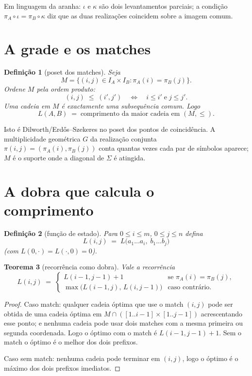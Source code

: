 \documentclass[11pt,a4paper]{article}
\newtheorem{teorema}{Teorema}
\newtheorem{definicao}[teorema]{Definição}
\begin{document}
\noindent Em linguagem da aranha: $\iota$ e $\kappa$ são dois
levantamentos parciais; a condição $\pi_A\circ\iota=\pi_B\circ\kappa$
diz que as duas realizações coincidem sobre a imagem comum.

\section{A grade e os matches}

\begin{definicao}[poset dos matches]
Seja
\[
M=\bigl\{(i,j)\in I_A\times I_B:\pi_A(i)=\pi_B(j)\bigr\}.
\]
Ordene $M$ pela ordem produto:
\[
(i,j)\;\le\;(i',j')\quad\iff\quad i\le i'\;\text{e}\;j\le j'.
\]
Uma cadeia em $M$ é exactamente uma subsequência comum.
Logo
\[
\boxed{\;L(A,B)\;=\;\text{comprimento da maior cadeia em }(M,\le).\;}
\]
\end{definicao}

\noindent Isto é Dilworth/Erdős–Szekeres no poset dos pontos de
coincidência. A multiplicidade geométrica $G$ da realização
conjunta $\pi(i,j)=(\pi_A(i),\pi_B(j))$ conta quantas vezes cada
par de símbolos aparece; $M$ é o suporte onde a diagonal de $\Sigma$
é atingida.

\section{A dobra que calcula o comprimento}

\begin{definicao}[função de estado]
Para $0\le i\le m$, $0\le j\le n$ defina
\[
L(i,j)\;=\;L\bigl(a_1\dots a_i,\;b_1\dots b_j\bigr)
\]
(com $L(0,\cdot)=L(\cdot,0)=0$).
\end{definicao}

\begin{teorema}[recorrência como dobra]\label{thm:lcs-dobra}
Vale a recorrência
\[
L(i,j)\;=\;
\begin{cases}
L(i-1,j-1)+1 & \text{se }\pi_A(i)=\pi_B(j),\\[4pt]
\max\bigl(L(i-1,j),\,L(i,j-1)\bigr) & \text{caso contrário.}
\end{cases}
\]
\end{teorema}

\begin{proof}
Caso match: qualquer cadeia óptima que use o match $(i,j)$ pode ser
obtida de uma cadeia óptima em $M\cap([1..i-1]\times[1..j-1])$
acrescentando esse ponto; e nenhuma cadeia pode usar dois matches
com a mesma primeira ou segunda coordenada. Logo o óptimo com o
match é $L(i-1,j-1)+1$. Sem o match o óptimo é o melhor dos dois
prefixos.

Caso sem match: nenhuma cadeia pode terminar em $(i,j)$, logo o
óptimo é o máximo dos dois prefixos imediatos.
\end{proof}
\end{document}
